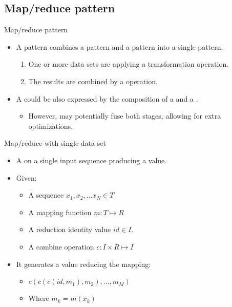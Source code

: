 \subsection{Map/reduce pattern}

\begin{frame}[t]{Map/reduce pattern}
\begin{itemize}
  \item A  pattern combines a  pattern and
        a  pattern into a single pattern.
    \begin{enumerate}
      \item One or more data sets are  applying a transformation operation.
      \item The results are combined by a  operation.
    \end{enumerate}
  \vfill
  \item A  could be also expressed by the composition of a
         and a . 
    \begin{itemize}
      \item However,  may potentially fuse both stages, 
            allowing for extra optimizations.
    \end{itemize}
\end{itemize}
\end{frame}

\begin{frame}[t]{Map/reduce with single data set}
\begin{itemize}
  \item A  on a single input sequence producing a value.
  \vfill\pause
  \item Given:
    \begin{itemize}
      \item A sequence $x_1, x_2, \ldots x_N \in T$
      \item A mapping function $m : T \mapsto R$
      \item A reduction identity value $id \in I$.
      \item A combine operation $c : I \times R \mapsto I$
    \end{itemize}
  \vfill\pause
  \item It generates a value reducing the mapping:
    \begin{itemize}
      \item $c(c(c(id,m_1),m_2), \ldots, m_M)$
      \item Where $m_k = m(x_k)$
    \end{itemize}
\end{itemize}
\end{frame}

